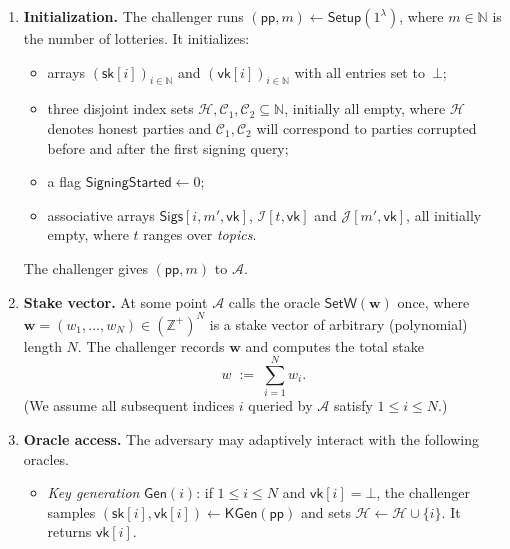 \documentclass{article}
\newcommand{\sk}[0]{\mathsf{sk}}
\newcommand{\vk}[0]{\mathsf{vk}}
\begin{document}
\begin{enumerate}
  \item \textbf{Initialization.}
        The challenger runs
        $(\mathsf{pp},m) \leftarrow \mathsf{Setup}(1^\lambda)$,
        where $m \in \mathbb{N}$ is the number of lotteries.
        It initializes:
        \begin{itemize}
          \item arrays $(\sk[i])_{i\in\mathbb{N}}$ and $(\vk[i])_{i\in\mathbb{N}}$
                with all entries set to~$\bot$;
          \item three disjoint index sets
                $\mathcal{H},\mathcal{C}_1,\mathcal{C}_2 \subseteq \mathbb{N}$,
                initially all empty, where
                $\mathcal{H}$ denotes honest parties and
                $\mathcal{C}_1,\mathcal{C}_2$ will correspond to parties
                corrupted before and after the first signing query;
          \item a flag $\mathsf{SigningStarted} \gets 0$;
          \item associative arrays
                $\mathsf{Sigs}[i,m',\vk]$,
                $\mathcal{I}[t,\vk]$ and
                $\mathcal{J}[m',\vk]$,
                all initially empty, where $t$ ranges over \emph{topics}.
        \end{itemize}
        The challenger gives $(\mathsf{pp},m)$ to $\mathcal{A}$.

  \item \textbf{Stake vector.}
        At some point $\mathcal{A}$ calls the oracle
        $\mathsf{SetW}(\mathbf{w})$ once, where
        $\mathbf{w} = (w_1,\dots,w_N) \in (\mathbb{Z}^+)^N$
        is a stake vector of arbitrary (polynomial) length $N$.
        The challenger records $\mathbf{w}$ and computes the total stake
        \[
          w \;:=\; \sum_{i=1}^{N} w_i .
        \]
        (We assume all subsequent indices $i$ queried by $\mathcal{A}$
        satisfy $1 \le i \le N$.)

  \item \textbf{Oracle access.}
        The adversary may adaptively interact with the following oracles.

        \begin{itemize}
          \item \emph{Key generation} $\mathsf{Gen}(i)$:
                if $1 \le i \le N$ and $\vk[i] = \bot$, the challenger samples
                $(\sk[i],\vk[i]) \leftarrow \mathsf{KGen}(\mathsf{pp})$ and sets
                $\mathcal{H} \gets \mathcal{H} \cup \{i\}$.
                It returns $\vk[i]$.


\end{itemize}
\end{enumerate}
\end{document}
